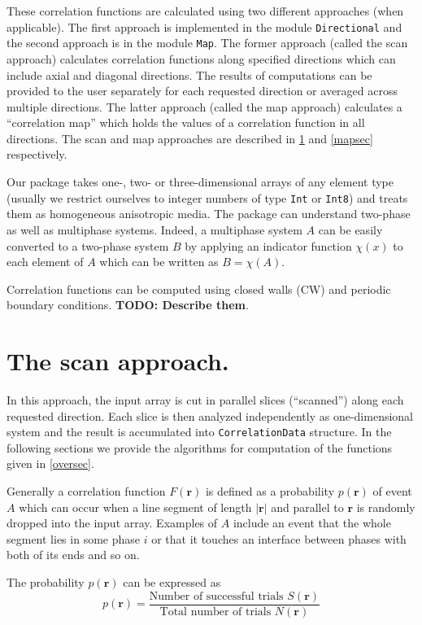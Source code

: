 \documentclass[reprint,amsmath,amssymb,aps,pre]{revtex4-1}
\newcommand{\code}[1]{\colorbox{light-gray}{\texttt{#1}}}
\begin{document}
These correlation functions are calculated using two different approaches (when
applicable). The first approach is implemented in the module \code{Directional}
and the second approach is in the module \code{Map}. The former approach (called
the scan approach) calculates correlation functions along specified directions
which can include axial and diagonal directions. The results of computations can
be provided to the user separately for each requested direction or averaged
across multiple directions. The latter approach (called the map approach)
calculates a ``correlation map'' which holds the values of a correlation
function in all directions. The scan and map approaches are described in
\cref{scansec} and \cref{mapsec} respectively.

Our package takes one-, two- or three-dimensional arrays of any element type
(usually we restrict ourselves to integer numbers of type \code{Int} or
\code{Int8}) and treats them as homogeneous anisotropic media. The package can
understand two-phase as well as multiphase systems. Indeed, a multiphase system
$A$ can be easily converted to a two-phase system $B$ by applying an indicator
function $\chi(x)$ to each element of $A$ which can be written as $B = \chi(A)$.

Correlation functions can be computed using closed walls (CW) and periodic
boundary conditions. \textbf{TODO: Describe them}.

\section{The scan approach.}
\label{scansec}
In this approach, the input array is cut in parallel slices (``scanned'') along
each requested direction. Each slice is then analyzed independently as
one-dimensional system and the result is accumulated into \code{CorrelationData}
structure. In the following sections we provide the algorithms for computation
of the functions given in \cref{oversec}.

Generally a correlation function $F(\bm{r})$ is defined as a probability
$p(\bm{r})$ of event $A$ which can occur when a line segment of length
$|\bm{r}|$ and parallel to $\bm{r}$ is randomly dropped into the input
array. Examples of $A$ include an event that the whole segment lies in some
phase $i$ or that it touches an interface between phases with both of its ends
and so on.

The probability $p(\bm{r})$ can be expressed as
\begin{equation*}
  p(\bm{r}) = \frac{\text{Number of successful trials $S(\bm{r})$}}
  {\text{Total number of trials $N(\bm{r})$}}
\end{equation*}
\end{document}
